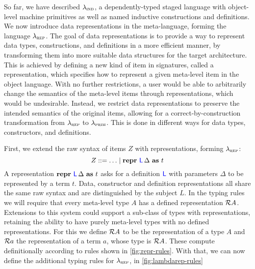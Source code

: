 So far, we have described $\lambdaind$, a dependently-typed staged language
with object-level machine primitives as well as named inductive constructions
and definitions. We now introduce data representations in the meta-language,
forming the language $\lambdarep$. The goal of data representations is to
provide a way to represent data types, constructions, and definitions in a more
efficient manner, by transforming them into more suitable data structures for
the target architecture. This is achieved by defining a new kind of item in
signatures, called a representation, which specifies how to represent a given
meta-level item in the object language. With no further restrictions, a user
would be able to arbitrarily change the semantics of the meta-level items
through representations, which would be undesirable. Instead, we restrict data
representations to preserve the intended semantics of the original items,
allowing for a correct-by-construction transformation from $\lambdarep$ to
$\lambdaprim$. This is done in different ways for data types, constructors, and
definitions.

First, we extend the raw syntax of items $Z$ with representations, forming
$\lambdarep$:
\[
  Z ::= \ldots \mid \Srepr{R}{L}{\Delta}{t}
\]
A representation $\Srepr{R}{L}{\Delta}{t}$ asks for a definition $\lab{L}$ with
parameters $\Delta$ to be represented by a term $t$. Data, constructor and
definition representations all share the same raw syntax and are distinguished
by the subject $L$. In the typing rules we will require that every meta-level
type $A$ has a defined representation $\Crepr{A}$. Extensions to this system
could support a sub-class of types with representations, retaining the ability
to have purely meta-level types with no defined representations. For this we
define $\Crepr{A}$ to be the representation of a type $A$ and $\crepr{a}$ the
representation of a term $a$, whose type is $\Crepr{A}$. These compute
definitionally according to rules shown in \cref{fig:repr-rules}. With that, we
can now define the additional typing rules for $\lambdarep$, in
\cref{fig:lambdarep-rules}

\newcommand\eqrule[1]{\begin{array}[t]{ll}{#1}\end{array}}

